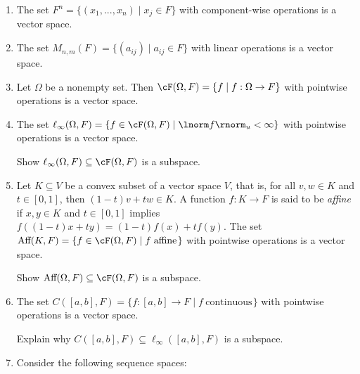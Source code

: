     \begin{example}
        \phantom{a}
        \begin{enumerate}[label = (\arabic*),itemsep=1pt,topsep=3pt]
            \item The set $F^n = \{(x_1,...,x_n) \mid x_j \in F\}$ with component-wise operations is a vector space.
            \item The set $M_{n,m}(F) = \{(a_{ij}) \mid a_{ij} \in F\}$ with linear operations is a vector space.
            \item Let $\Omega$ be a nonempty set. Then $\cF(\Omega,F) = \{f \mid f:\Omega \rightarrow F\}$ with pointwise operations is a vector space.
            \item The set $\ell_\infty(\Omega,F) = \{f \in \cF(\Omega,F) \mid \lnorm f \rnorm _u < \infty \}$ with pointwise operations is a vector space.
                \begin{exercise}
                    Show $\ell_\infty(\Omega,F) \subseteq \cF(\Omega,F)$ is a subspace.
                \end{exercise}
            \item Let $K \subseteq V$ be a convex subset of a vector space $V$, that is, for all $v,w \in K$ and $t \in [0,1]$, then $(1-t)v + tw \in K$. A function $f:K \rightarrow F$ is said to be \textit{affine} if $x,y \in K$ and $t \in [0,1]$ implies $f((1-t)x + ty) = (1-t)f(x) + tf(y)$. The set \newline $\text{Aff}(K,F) = \{f \in \cF(\Omega,F) \mid f \hspace{3pt}\text{affine}\hspace{1pt}\}$ with pointwise operations is a vector space.
                \begin{exercise}
                    Show $\text{Aff}(\Omega,F) \subseteq \cF(\Omega,F)$ is a subspace.
                \end{exercise}
            \item The set $C([a,b],F) = \{f:[a,b] \rightarrow F \mid f \hspace{3pt}\text{continuous}\hspace{1pt}\}$ with pointwise operations is a vector space.
                \begin{exercise}
                    Explain why $C([a,b],F) \subseteq \ell_\infty([a,b],F)$ is a subspace.
                \end{exercise}
            \item Consider the following sequence spaces:
                \begin{itemize}

\end{itemize}
\end{enumerate}
\end{example}

